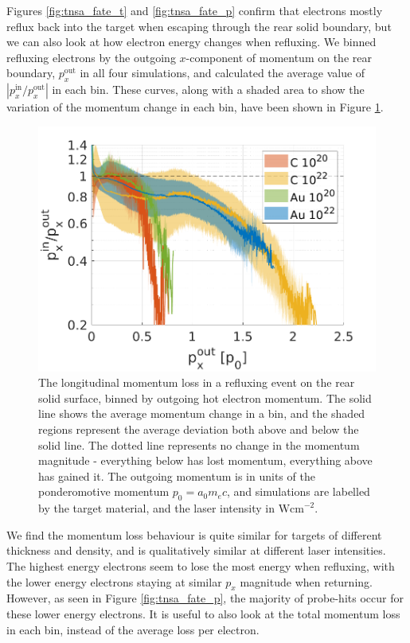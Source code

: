 \documentclass[12pt]{article}
\numberwithin{equation}{section}
\begin{document}
Figures \ref{fig:tnsa_fate_t} and \ref{fig:tnsa_fate_p} confirm that electrons mostly reflux back into the target when escaping through the rear solid boundary, but we can also look at how electron energy changes when refluxing. We binned refluxing electrons by the outgoing $x$-component of momentum on the rear boundary, $p_x^\text{out}$ in all four simulations, and calculated the average value of $|p_x^\text{in}/p_x^\text{out}|$ in each bin. These curves, along with a shaded area to show the variation of the momentum change in each bin, have been shown in Figure \ref{fig:tnsa_loss}.

\begin{figure}
\centering
  \includegraphics[width=0.6\linewidth]{Figures/tnsa_rear.png}
\caption{The longitudinal momentum loss in a refluxing event on the rear solid surface, binned by outgoing hot electron momentum. The solid line shows the average momentum change in a bin, and the shaded regions represent the average deviation both above and below the solid line. The dotted line represents no change in the momentum magnitude - everything below has lost momentum, everything above has gained it. The outgoing momentum is in units of the ponderomotive momentum $p_0=a_0m_e c$, and simulations are labelled by the target material, and the laser intensity in $\text{Wcm}^{-2}$.}
\label{fig:tnsa_loss}
\end{figure}

We find the momentum loss behaviour is quite similar for targets of different thickness and density, and is qualitatively similar at different laser intensities. The highest energy electrons seem to lose the most energy when refluxing, with the lower energy electrons staying at similar $p_x$ magnitude when returning. However, as seen in Figure \ref{fig:tnsa_fate_p}, the majority of probe-hits occur for these lower energy electrons. It is useful to also look at the total momentum loss in each bin, instead of the average loss per electron.
\end{document}
